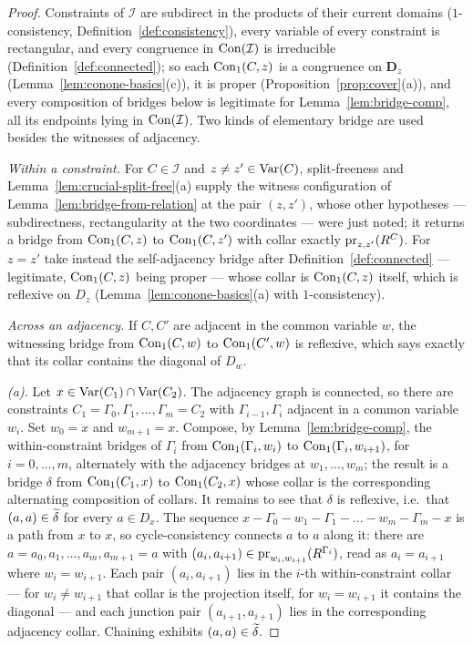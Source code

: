 \begin{proof}
Constraints of $\mathcal I$ are subdirect in the products of their current
domains ($1$-consistency, Definition~\ref{def:consistency}), every variable
of every constraint is rectangular, and every congruence in
$\operatorname{Con}(\mathcal I)$ is irreducible (Definition~\ref{def:connected}); so each
$\operatorname{Con}_1(C,z)$ is a congruence on $\mathbf D_{z}$
(Lemma~\ref{lem:conone-basics}(c)), it is proper
(Proposition~\ref{prop:cover}(a)), and every composition of bridges below is
legitimate for Lemma~\ref{lem:bridge-comp}, all its endpoints lying in
$\operatorname{Con}(\mathcal I)$. Two kinds of elementary bridge are used besides the
witnesses of adjacency.

\emph{Within a constraint.} For $C\in\mathcal I$ and $z\neq z'\in\operatorname{Var}(C)$,
split-freeness and Lemma~\ref{lem:crucial-split-free}(a) supply the witness
configuration of Lemma~\ref{lem:bridge-from-relation} at the pair $(z,z')$,
whose other hypotheses --- subdirectness, rectangularity at the two
coordinates --- were just noted; it returns a bridge from $\operatorname{Con}_1(C,z)$ to
$\operatorname{Con}_1(C,z')$ with collar exactly $\operatorname*{pr}_{z,z'}(R^{C})$. For $z=z'$ take
instead the self-adjacency bridge after Definition~\ref{def:connected} ---
legitimate, $\operatorname{Con}_1(C,z)$ being proper --- whose collar is $\operatorname{Con}_1(C,z)$
itself, which is reflexive on $D_{z}$ (Lemma~\ref{lem:conone-basics}(a) with
$1$-consistency).

\emph{Across an adjacency.} If $C,C'$ are adjacent in the common variable
$w$, the witnessing bridge from $\operatorname{Con}_1(C,w)$ to $\operatorname{Con}_1(C',w)$ is
reflexive, which says exactly that its collar contains the diagonal of
$D_{w}$.

\emph{(a).} Let $x\in\operatorname{Var}(C_{1})\cap\operatorname{Var}(C_{2})$. The adjacency graph is
connected, so there are constraints
$C_{1}=\Gamma_{0},\Gamma_{1},\dots,\Gamma_{m}=C_{2}$ with
$\Gamma_{i-1},\Gamma_{i}$ adjacent in a common variable $w_{i}$. Set
$w_{0}=x$ and $w_{m+1}=x$. Compose, by Lemma~\ref{lem:bridge-comp}, the
within-constraint bridges of $\Gamma_{i}$ from $\operatorname{Con}_1(\Gamma_{i},w_{i})$
to $\operatorname{Con}_1(\Gamma_{i},w_{i+1})$, for $i=0,\dots,m$, alternately with the
adjacency bridges at $w_{1},\dots,w_{m}$; the result is a bridge $\delta$
from $\operatorname{Con}_1(C_{1},x)$ to $\operatorname{Con}_1(C_{2},x)$ whose collar is the
corresponding alternating composition of collars. It remains to see that
$\delta$ is reflexive, i.e.\ that $(a,a)\in\widetilde{\delta}$ for every
$a\in D_{x}$. The sequence
$x-\Gamma_{0}-w_{1}-\Gamma_{1}-\dots-w_{m}-\Gamma_{m}-x$ is a path from $x$
to $x$, so cycle-consistency connects $a$ to $a$ along it: there are
$a=a_{0},a_{1},\dots,a_{m},a_{m+1}=a$ with
$(a_{i},a_{i+1})\in\operatorname*{pr}_{w_{i},w_{i+1}}(R^{\Gamma_{i}})$, read as
$a_{i}=a_{i+1}$ where $w_{i}=w_{i+1}$. Each pair $(a_{i},a_{i+1})$ lies in
the $i$-th within-constraint collar --- for $w_{i}\neq w_{i+1}$ that collar
is the projection itself, for $w_{i}=w_{i+1}$ it contains the diagonal ---
and each junction pair $(a_{i+1},a_{i+1})$ lies in the corresponding
adjacency collar. Chaining exhibits $(a,a)\in\widetilde{\delta}$.


\end{proof}
